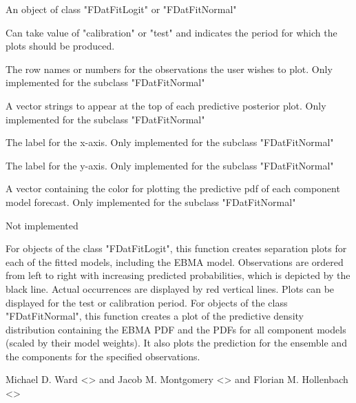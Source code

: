 \documentclass[a4paper]{book}
\begin{document}
\begin{Arguments}
\begin{ldescription}
\item[\code{x}] An object of class "FDatFitLogit" or "FDatFitNormal"

\item[\code{period}] Can take value of "calibration" or "test" and indicates the period for which the plots should be produced.

\item[\code{subset}] The row names or numbers for the observations the user wishes to plot.  Only implemented for the subclass "FDatFitNormal"

\item[\code{mainLabel}] A vector strings to appear at the top of each predictive posterior plot.  Only implemented for the subclass "FDatFitNormal"

\item[\code{xLab}] The label for the x-axis. Only implemented for the subclass "FDatFitNormal"

\item[\code{yLab}] The label for the y-axis.  Only implemented for the subclass "FDatFitNormal"

\item[\code{cols}] A vector containing the color for plotting the predictive pdf of each component model forecast. Only implemented for the subclass "FDatFitNormal"

\item[\code{...}] Not implemented
\end{ldescription}
\end{Arguments}
%
\begin{Details}\relax
For objects of the class "FDatFitLogit", this function creates separation plots for each of the fitted models, including the EBMA model. Observations are ordered from left to right with increasing predicted probabilities, which is depicted by the black line. Actual occurrences are displayed by red vertical lines. Plots can be displayed for the test or calibration period.
For objects of the class "FDatFitNormal", this function creates a plot of the predictive density distribution containing the EBMA PDF and the PDFs for all component models (scaled by their model weights).  It also plots the prediction for the ensemble and the components for the specified observations.
\end{Details}
%
\begin{Author}\relax
Michael D. Ward <> and Jacob M. Montgomery <> and Florian M. Hollenbach <>
\end{Author}
\end{document}
